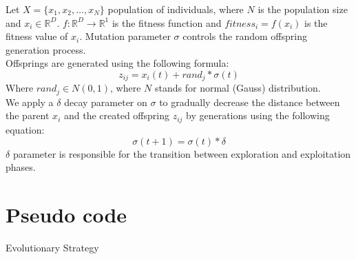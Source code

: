 \documentclass[border=0.2cm]{report}
\newcommand{\R}{\mathbb{R}} %
\begin{document}
\noindent
Let $X=\{x_1,x_2,\ldots,x_N\}$ population of individuals, where $N$ is the population size and $x_i \in \R^D$.
$f: \R^{D}\to\R^1$ is the fitness function and $fitness_i=f(x_i)$ is the fitness value of $x_i$. Mutation parameter $\sigma$ controls the random offspring generation process.\\
\noindent
Offsprings are generated using the following formula: \\
\begin{equation}\label{eqn_es_generate_offspring}
z_{ij}=x_i(t)+rand_j*\sigma(t)
\end{equation}
Where $rand_{j} \in N(0, 1)$, where $N$ stands for normal (Gauss) distribution. \\ 
We apply a $\delta$ decay parameter on $\sigma$ to gradually decrease the distance between the parent $x_i$ and the created offspring $z_{ij}$ by generations using the following equation:\\
\begin{equation}\label{eqn_es_sigma_decay}
\sigma(t+1)=\sigma(t)*\delta
\end{equation}
$\delta$ parameter is responsible for the transition between exploration and exploitation phases.

\section{Pseudo code}

\begin{algorithm}[H]
\caption{Evolutionary Strategy}
 
\end{algorithm}
\end{document}
